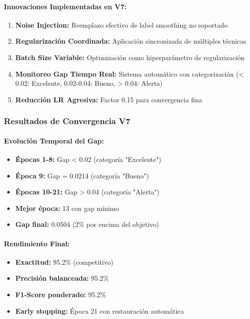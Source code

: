\paragraph{Innovaciones Implementadas en V7:}
\begin{enumerate}
    \item \textbf{Noise Injection:} Reemplazo efectivo de label smoothing no soportado
    \item \textbf{Regularización Coordinada:} Aplicación sincronizada de múltiples técnicas
    \item \textbf{Batch Size Variable:} Optimización como hiperparámetro de regularización
    \item \textbf{Monitoreo Gap Tiempo Real:} Sistema automático con categorización (< 0.02: Excelente, 0.02-0.04: Bueno, > 0.04: Alerta)
    \item \textbf{Reducción LR Agresiva:} Factor 0.15 para convergencia fina
\end{enumerate}

\subsubsection{Resultados de Convergencia V7}

\paragraph{Evolución Temporal del Gap:}
\begin{itemize}
    \item \textbf{Épocas 1-8:} Gap < 0.02 (categoría "Excelente")
    \item \textbf{Época 9:} Gap = 0.0214 (categoría "Bueno")
    \item \textbf{Épocas 10-21:} Gap > 0.04 (categoría "Alerta")
    \item \textbf{Mejor época:} 13 con gap mínimo
    \item \textbf{Gap final:} 0.0504 (2\% por encima del objetivo)
\end{itemize}

\paragraph{Rendimiento Final:}
\begin{itemize}
    \item \textbf{Exactitud:} 95.2\% (competitivo)
    \item \textbf{Precisión balanceada:} 95.2\%
    \item \textbf{F1-Score ponderado:} 95.2\%
    \item \textbf{Early stopping:} Época 21 con restauración automática
\end{itemize}

